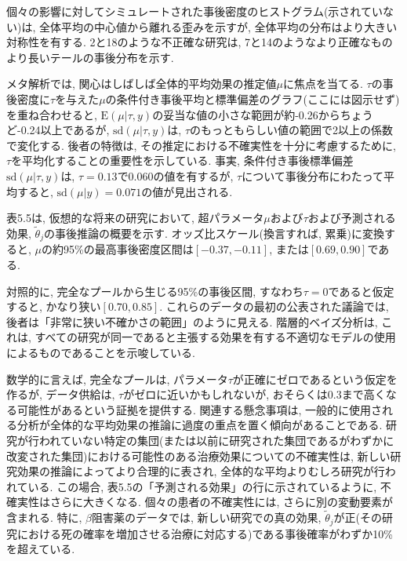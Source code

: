 \documentclass[10pt,dvipdfmx,a4]{beamer}
\begin{document}
\begin{frame}
個々の影響に対してシミュレートされた事後密度のヒストグラム(示されていない)は, 全体平均の中心値から離れる歪みを示すが, 全体平均の分布はより大きい対称性を有する.
2と18のような不正確な研究は, 7と14のようなより正確なものより長いテールの事後分布を示す.

メタ解析では, 関心はしばしば全体的平均効果の推定値$\mu$に焦点を当てる.
$\tau$の事後密度に$\tau$を与えた$\mu$の条件付き事後平均と標準偏差のグラフ(ここには図示せず)を重ね合わせると, $\text{E}(\mu|\tau, y)$の妥当な値の小さな範囲が約-0.26からちょうど-0.24以上であるが, $\text{sd}(\mu|\tau, y)$は, $\tau$のもっともらしい値の範囲で2以上の係数で変化する.
後者の特徴は, その推定における不確実性を十分に考慮するために, $\tau$を平均化することの重要性を示している.
事実, 条件付き事後標準偏差$\text{sd}(\mu|\tau, y)$は, $\tau=0.13$で0.060の値を有するが, $\tau$について事後分布にわたって平均すると, $\text{sd}(\mu|y)=0.071$の値が見出される.

表5.5は, 仮想的な将来の研究において, 超パラメータ$\mu$および$\tau$および予測される効果, $\tilde{\theta}_j$の事後推論の概要を示す.
オッズ比スケール(換言すれば, 累乗)に変換すると, $\mu$の約95\%の最高事後密度区間は$[-0.37, -0.11]$, または$[0.69,0.90]$である.
\end{frame}


\begin{frame}
対照的に, 完全なプールから生じる95\%の事後区間, すなわち$\tau=0$であると仮定すると, かなり狭い$[0.70,0.85]$.
これらのデータの最初の公表された議論では, 後者は「非常に狭い不確かさの範囲」のように見える.
階層的ベイズ分析は, これは, すべての研究が同一であると主張する効果を有する不適切なモデルの使用によるものであることを示唆している.

数学的に言えば, 完全なプールは, パラメータ$\tau$が正確にゼロであるという仮定を作るが, データ供給は, $\tau$がゼロに近いかもしれないが, おそらくは0.3まで高くなる可能性があるという証拠を提供する.
関連する懸念事項は, 一般的に使用される分析が全体的な平均効果の推論に過度の重点を置く傾向があることである.
研究が行われていない特定の集団(または以前に研究された集団であるがわずかに改変された集団)における可能性のある治療効果についての不確実性は, 新しい研究効果の推論によってより合理的に表され, 全体的な平均よりむしろ研究が行われている.
この場合, 表5.5の「予測される効果」の行に示されているように, 不確実性はさらに大きくなる.
個々の患者の不確実性には, さらに別の変動要素が含まれる.
特に, $\beta$阻害薬のデータでは, 新しい研究での真の効果, $\tilde{\theta}_j$が正(その研究における死の確率を増加させる治療に対応する)である事後確率がわずか10\%を超えている.
\end{frame}
\end{document}
